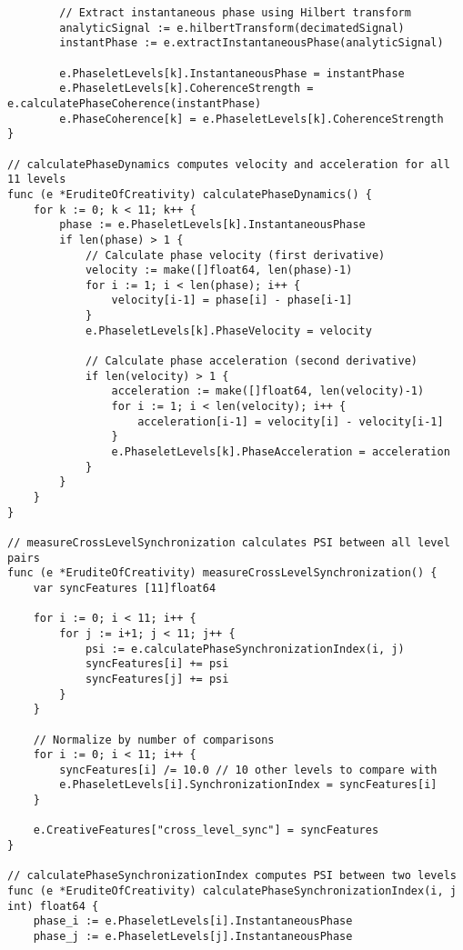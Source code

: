 \begin{tcolorbox}[colback=CodeBackground, colframe=DarkGray, title=Erudite of Creativity Implementation, fonttitle=\bfseries]
\begin{verbatim}
        // Extract instantaneous phase using Hilbert transform
        analyticSignal := e.hilbertTransform(decimatedSignal)
        instantPhase := e.extractInstantaneousPhase(analyticSignal)
        
        e.PhaseletLevels[k].InstantaneousPhase = instantPhase
        e.PhaseletLevels[k].CoherenceStrength = e.calculatePhaseCoherence(instantPhase)
        e.PhaseCoherence[k] = e.PhaseletLevels[k].CoherenceStrength
}

// calculatePhaseDynamics computes velocity and acceleration for all 11 levels
func (e *EruditeOfCreativity) calculatePhaseDynamics() {
    for k := 0; k < 11; k++ {
        phase := e.PhaseletLevels[k].InstantaneousPhase
        if len(phase) > 1 {
            // Calculate phase velocity (first derivative)
            velocity := make([]float64, len(phase)-1)
            for i := 1; i < len(phase); i++ {
                velocity[i-1] = phase[i] - phase[i-1]
            }
            e.PhaseletLevels[k].PhaseVelocity = velocity
            
            // Calculate phase acceleration (second derivative)
            if len(velocity) > 1 {
                acceleration := make([]float64, len(velocity)-1)
                for i := 1; i < len(velocity); i++ {
                    acceleration[i-1] = velocity[i] - velocity[i-1]
                }
                e.PhaseletLevels[k].PhaseAcceleration = acceleration
            }
        }
    }
}

// measureCrossLevelSynchronization calculates PSI between all level pairs
func (e *EruditeOfCreativity) measureCrossLevelSynchronization() {
    var syncFeatures [11]float64
    
    for i := 0; i < 11; i++ {
        for j := i+1; j < 11; j++ {
            psi := e.calculatePhaseSynchronizationIndex(i, j)
            syncFeatures[i] += psi
            syncFeatures[j] += psi
        }
    }
    
    // Normalize by number of comparisons
    for i := 0; i < 11; i++ {
        syncFeatures[i] /= 10.0 // 10 other levels to compare with
        e.PhaseletLevels[i].SynchronizationIndex = syncFeatures[i]
    }
    
    e.CreativeFeatures["cross_level_sync"] = syncFeatures
}

// calculatePhaseSynchronizationIndex computes PSI between two levels
func (e *EruditeOfCreativity) calculatePhaseSynchronizationIndex(i, j int) float64 {
    phase_i := e.PhaseletLevels[i].InstantaneousPhase
    phase_j := e.PhaseletLevels[j].InstantaneousPhase
    

\end{verbatim}
\end{tcolorbox}
